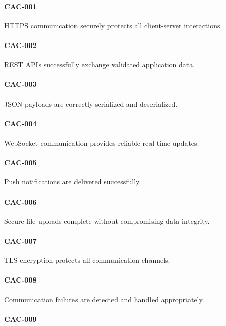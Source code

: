 \paragraph{CAC-001}

HTTPS communication securely protects all client-server interactions.

\paragraph{CAC-002}

REST APIs successfully exchange validated application data.

\paragraph{CAC-003}

JSON payloads are correctly serialized and deserialized.

\paragraph{CAC-004}

WebSocket communication provides reliable real-time updates.

\paragraph{CAC-005}

Push notifications are delivered successfully.

\paragraph{CAC-006}

Secure file uploads complete without compromising data integrity.

\paragraph{CAC-007}

TLS encryption protects all communication channels.

\paragraph{CAC-008}

Communication failures are detected and handled appropriately.

\paragraph{CAC-009}

